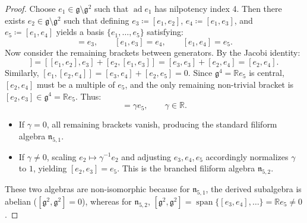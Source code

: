 \documentclass[11pt,a4paper]{article}
\theoremstyle{definition}
\theoremstyle{remark}
\newcommand{\R}{\mathbb{R}}
\newcommand{\g}{\mathfrak{g}}
\newcommand{\ad}{\operatorname{ad}}
\newcommand{\spanop}{\operatorname{span}}
\begin{document}
\begin{proof}
Choose $e_1 \in \g \setminus \g^2$ such that $\ad e_1$ has nilpotency index 4. Then there exists $e_2 \in \g \setminus \g^2$ such that defining $e_3 \coloneqq [e_1, e_2]$, $e_4 \coloneqq [e_1, e_3]$, and $e_5 \coloneqq [e_1, e_4]$ yields a basis $\{e_1, \dots, e_5\}$ satisfying:
\begin{equation}
    [e_1, e_2] = e_3, \qquad [e_1, e_3] = e_4, \qquad [e_1, e_4] = e_5.
\end{equation}
Now consider the remaining brackets between generators. By the Jacobi identity:
\begin{equation}
    [e_1, [e_2, e_3]] = [[e_1, e_2], e_3] + [e_2, [e_1, e_3]] = [e_3, e_3] + [e_2, e_4] = [e_2, e_4].
\end{equation}
Similarly, $[e_1, [e_2, e_4]] = [e_3, e_4] + [e_2, e_5] = 0$. Since $\g^4 = \R e_5$ is central, $[e_2, e_4]$ must be a multiple of $e_5$, and the only remaining non-trivial bracket is $[e_2, e_3] \in \g^4 = \R e_5$.
Thus:
\begin{equation}
    [e_2, e_3] = \gamma e_5, \qquad \gamma \in \R.
\end{equation}
\begin{itemize}
    \item If $\gamma = 0$, all remaining brackets vanish, producing the standard filiform algebra $\mathfrak{n}_{5,1}$.
    \item If $\gamma \neq 0$, scaling $e_2 \mapsto \gamma^{-1} e_2$ and adjusting $e_3, e_4, e_5$ accordingly normalizes $\gamma$ to $1$, yielding $[e_2, e_3] = e_5$. This is the branched filiform algebra $\mathfrak{n}_{5,2}$.
\end{itemize}
These two algebras are non-isomorphic because for $\mathfrak{n}_{5,1}$, the derived subalgebra is abelian ($[\g^2, \g^2] = 0$), whereas for $\mathfrak{n}_{5,2}$, $[\g^2, \g^2] = \spanop\{[e_3, e_4], \dots\} = \R e_5 \neq 0$.


\end{proof}
\end{document}
